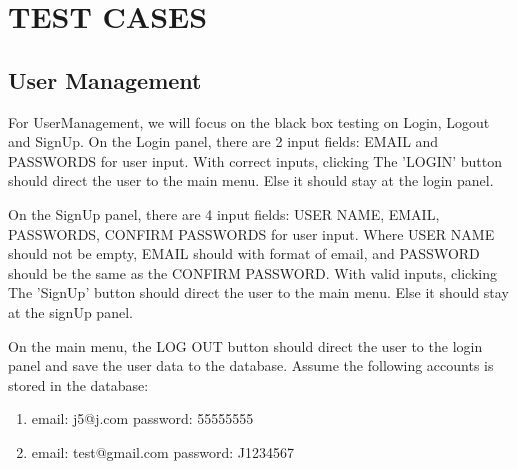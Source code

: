 \documentclass[11pt]{article}
\begin{document}
    \section{TEST CASES}
    \subsection{User Management}

    For UserManagement, we will focus on the black box testing on Login, Logout and SignUp.
    On the Login panel, there are 2 input fields: EMAIL and PASSWORDS for user input.
    With correct inputs, clicking The 'LOGIN' button should direct the user to the main menu. Else it should stay at the login panel.

    On the SignUp panel, there are 4 input fields: USER NAME, EMAIL, PASSWORDS, CONFIRM PASSWORDS for user input.
    Where USER NAME should not be empty, EMAIL should with format of email, and PASSWORD should be the same as the CONFIRM PASSWORD.
    With valid inputs, clicking The 'SignUp' button should direct the user to the main menu. Else it should stay at the signUp panel.

    On the main menu, the LOG OUT button should direct the user to the login panel and save the user data to the database.
    Assume the following accounts is stored in the database:
    \begin{enumerate}
        \item email: j5@j.com password: 55555555
        \item email: test@gmail.com password: J1234567
    \end{enumerate}
\end{document}
